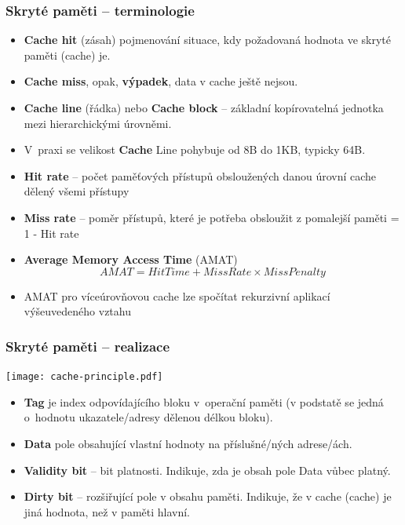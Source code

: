 \documentclass{beamer}
\begin{document}
\begin{frame}
\frametitle{Skryté paměti -- terminologie}

\begin{itemize}
\item \textbf{Cache hit} (zásah) pojmenování situace, kdy požadovaná hodnota ve skryté paměti (cache) je.
\item \textbf{Cache miss}, opak, \textbf{výpadek}, data v cache ještě nejsou.
\item \textbf{Cache line} (řádka) nebo \textbf{Cache block} – základní kopírovatelná jednotka mezi hierarchickými úrovněmi. 
\item V praxi se velikost \textbf{Cache} Line pohybuje od 8B do 1KB, typicky 64B.
\item \textbf{Hit rate} -- počet paměťových přístupů obsloužených danou úrovní cache dělený všemi přístupy
\item \textbf{Miss rate} -- poměr přístupů, které je potřeba obsloužit z pomalejší paměti = 1 - Hit rate
\item \textbf{Average Memory Access Time} (AMAT) $$AMAT = Hit Time + Miss Rate \times Miss Penalty$$
\item AMAT pro víceúrovňovou cache lze spočítat rekurzivní aplikací výšeuvedeného vztahu
\end{itemize}

\end{frame}

\begin{frame}
\frametitle{Skryté paměti -- realizace}
{
\centering

\texttt{[image: cache-principle.pdf]}

}
\vskip 2mm

\begin{itemize}
\item \textbf{Tag} je index odpovídajícího bloku v operační paměti (v podstatě se jedná o hodnotu ukazatele/adresy dělenou délkou bloku).
\item \textbf{Data} pole obsahující vlastní hodnoty na příslušné/ných adrese/ách.
\item \textbf{Validity bit} – bit platnosti. Indikuje, zda je obsah pole Data vůbec platný.  
\item \textbf{Dirty bit} – rozšiřující pole v obsahu paměti. Indikuje, že v cache (cache) je jiná hodnota, než v paměti hlavní.
\end{itemize}

\end{frame}
\end{document}
